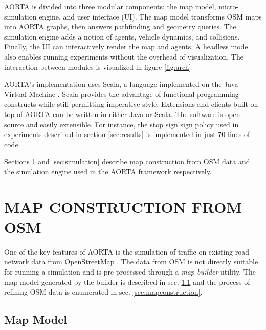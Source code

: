 \documentclass[letterpaper, 10 pt, conference]{ieeeconf}  %
\begin{document}
AORTA is divided into three modular components: the map model, micro-simulation
engine, and user interface (UI). The map model transforms OSM maps into AORTA
graphs, then answers pathfinding and geometry queries. The simulation engine
adds a notion of agents, vehicle dynamics, and collisions. Finally, the UI can
interactively render the map and agents. A headless mode also enables running
experiments without the overhead of visualization. The interaction between
modules is visualized in figure \ref{fig:arch}.

AORTA's implementation uses Scala, a language implemented on the Java Virtual
Machine \cite{scala}. Scala provides the advantage of functional programming
constructs while still permitting imperative style.  Extensions and clients
built on top of AORTA can be written in either Java or Scala. The software is
open-source and easily extensible. For instance, the stop sign sign policy used
in experiments described in section \ref{sec:results} is implemented in just 70
lines of code. 

Sections \ref{sec:map} and \ref{sec:simulation} describe map construction from
OSM data and the simulation engine used in the AORTA framework respectively.


\section{MAP CONSTRUCTION FROM OSM}
\label{sec:map}

One of the key features of AORTA is the simulation of traffic on existing road
network data from OpenStreetMap \cite{osm}. The data from OSM is not directly
suitable for running a simulation and is pre-processed through a \emph{map
builder} utility. The map model generated by the builder is described in sec.
\ref{sec:mapmodel} and the process of refining OSM data is enumerated in sec.
\ref{sec:mapconstruction}.

\subsection{Map Model}
\label{sec:mapmodel}


\end{document}
